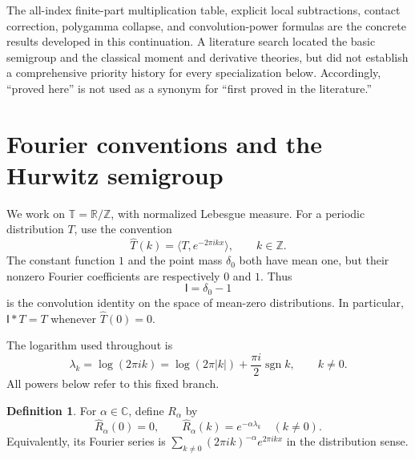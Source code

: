 \documentclass[11pt]{article}
\numberwithin{equation}{section}
\theoremstyle{definition}
\newtheorem{definition}[theorem]{Definition}
\theoremstyle{remark}
\newcommand{\T}{\mathbb T}
\newcommand{\C}{\mathbb C}
\newcommand{\Z}{\mathbb Z}
\newcommand{\Id}{\mathsf I}
\begin{document}
The all-index finite-part multiplication table, explicit local
subtractions, contact correction, polygamma collapse, and convolution-power
formulas are the concrete results developed in this continuation. A
literature search located the basic semigroup and the classical moment
and derivative theories, but did not establish a comprehensive priority
history for every specialization below. Accordingly, ``proved here'' is
not used as a synonym for ``first proved in the literature.''

\section{Fourier conventions and the Hurwitz semigroup}
\label{sec:semigroup}
We work on $\T=\mathbb R/\mathbb Z$, with normalized Lebesgue measure.
For a periodic distribution $T$, use the convention
\[
 \widehat T(k)=\langle T,e^{-2\pi i kx}\rangle,\qquad k\in\Z.
\]
The constant function $1$ and the point mass $\delta_0$ both have mean
one, but their nonzero Fourier coefficients are respectively $0$ and $1$.
Thus
\[
 \Id=\delta_0-1
\]
is the convolution identity on the space of mean-zero distributions. In
particular, $\Id*T=T$ whenever $\widehat T(0)=0$.

The logarithm used throughout is
\begin{equation}\label{eq:logbranch}
 \lambda_k=\log(2\pi i k)
 =\log(2\pi|k|)+\frac{\pi i}{2}\operatorname{sgn}k,
 \qquad k\ne0.
\end{equation}
All powers below refer to this fixed branch.

\begin{definition}\label{def:R}
For $\alpha\in\C$, define $R_\alpha$ by
\begin{equation}\label{eq:Rfourier}
 \widehat R_\alpha(0)=0,\qquad
 \widehat R_\alpha(k)=e^{-\alpha\lambda_k}\quad(k\ne0).
\end{equation}
Equivalently, its Fourier series is
$\sum_{k\ne0}(2\pi i k)^{-\alpha}e^{2\pi i kx}$ in the distribution sense.
\end{definition}
\end{document}

